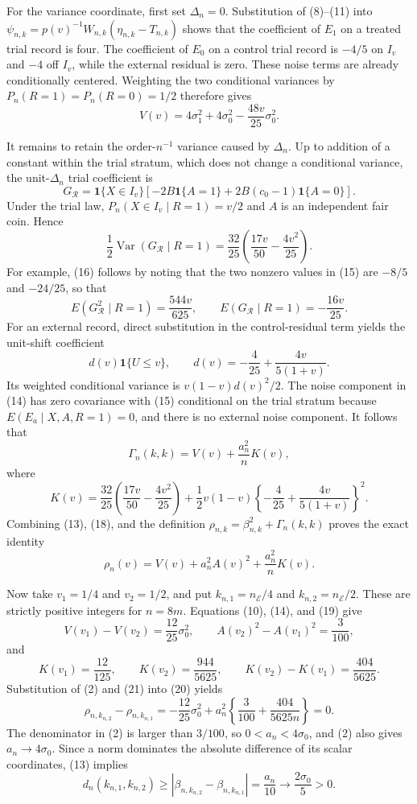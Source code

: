 For the variance coordinate, first set \(\Delta_n=0\).  Substitution of (8)--(11) into \(\psi_{n,k}=p(v)^{-1}W_{n,k}(\eta_{n,k}-T_{n,k})\) shows that the coefficient of \(E_1\) on a treated trial record is four.  The coefficient of \(E_0\) on a control trial record is \(-4/5\) on \(I_v\) and \(-4\) off \(I_v\), while the external residual is zero.  These noise terms are already conditionally centered.  Weighting the two conditional variances by \(P_n(R=1)=P_n(R=0)=1/2\) therefore gives
\[
 V(v)=4\sigma_1^2+4\sigma_0^2-\frac{48v}{25}\sigma_0^2.
 \tag{14}
\]

It remains to retain the order-\(n^{-1}\) variance caused by \(\Delta_n\).  Up to addition of a constant within the trial stratum, which does not change a conditional variance, the unit-\(\Delta_n\) trial coefficient is
\[
 G_{\mathcal R}
 =\mathbf 1\{X\in I_v\}
 \left[-2B\mathbf 1\{A=1\}
 +2B(c_0-1)\mathbf 1\{A=0\}\right].
 \tag{15}
\]
Under the trial law, \(P_n(X\in I_v\mid R=1)=v/2\) and \(A\) is an independent fair coin.  Hence
\[
 \frac12\operatorname{Var}(G_{\mathcal R}\mid R=1)
 =\frac{32}{25}\left(\frac{17v}{50}-\frac{4v^2}{25}\right).
 \tag{16}
\]
For example, (16) follows by noting that the two nonzero values in (15) are \(-8/5\) and \(-24/25\), so that
\[
 E(G_{\mathcal R}^2\mid R=1)=\frac{544v}{625},
 \qquad
 E(G_{\mathcal R}\mid R=1)=-\frac{16v}{25}.
\]
For an external record, direct substitution in the control-residual term yields the unit-shift coefficient
\[
 d(v)\mathbf 1\{U\leq v\},
 \qquad
 d(v)=-\frac4{25}+\frac{4v}{5(1+v)}.
 \tag{17}
\]
Its weighted conditional variance is \(v(1-v)d(v)^2/2\).  The noise component in (14) has zero covariance with (15) conditional on the trial stratum because \(E(E_a\mid X,A,R=1)=0\), and there is no external noise component.  It follows that
\[
 \Gamma_n(k,k)=V(v)+\frac{a_n^2}{n}K(v),
 \tag{18}
\]
where
\[
 K(v)=
 \frac{32}{25}\left(\frac{17v}{50}-\frac{4v^2}{25}\right)
 +\frac12v(1-v)
 \left\{-\frac4{25}+\frac{4v}{5(1+v)}\right\}^{2}.
 \tag{19}
\]
Combining (13), (18), and the definition \(\rho_{n,k}=\beta_{n,k}^2+\Gamma_n(k,k)\) proves the exact identity
\[
 \rho_n(v)=V(v)+a_n^2A(v)^2+\frac{a_n^2}{n}K(v).
 \tag{20}
\]

Now take \(v_1=1/4\) and \(v_2=1/2\), and put \(k_{n,1}=n_{\mathcal E}/4\) and \(k_{n,2}=n_{\mathcal E}/2\).  These are strictly positive integers for \(n=8m\).  Equations (10), (14), and (19) give
\[
 V(v_1)-V(v_2)=\frac{12}{25}\sigma_0^2,
 \qquad
 A(v_2)^2-A(v_1)^2=\frac3{100},
\]
and
\[
 K(v_1)=\frac{12}{125},
 \qquad
 K(v_2)=\frac{944}{5625},
 \qquad
 K(v_2)-K(v_1)=\frac{404}{5625}.
 \tag{21}
\]
Substitution of (2) and (21) into (20) yields
\[
 \rho_{n,k_{n,2}}-\rho_{n,k_{n,1}}
 =-\frac{12}{25}\sigma_0^2
 +a_n^2\left\{\frac3{100}+\frac{404}{5625n}\right\}=0.
 \tag{22}
\]
The denominator in (2) is larger than \(3/100\), so \(0<a_n<4\sigma_0\), and (2) also gives \(a_n\to4\sigma_0\).  Since a norm dominates the absolute difference of its scalar coordinates, (13) implies
\[
 d_n(k_{n,1},k_{n,2})
 \geq |\beta_{n,k_{n,2}}-\beta_{n,k_{n,1}}|
 =\frac{a_n}{10}
 \longrightarrow\frac{2\sigma_0}{5}>0.
 \tag{23}
\]

